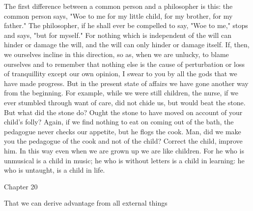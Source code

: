 \documentclass[a4paper]{article}
\begin{document}
    The first difference between a common person and a philosopher is this: the
common person says, "Woe to me for my little child, for my brother, for my
father." The philosopher, if he shall ever be compelled to say, "Woe to me,"
stops and says, "but for myself." For nothing which is independent of the will
can hinder or damage the will, and the will can only hinder or damage itself.
If, then, we ourselves incline in this direction, so as, when we are unlucky,
to blame ourselves and to remember that nothing else is the cause of
perturbation or loss of tranquillity except our own opinion, I swear to you by
all the gods that we have made progress. But in the present state of affairs we
have gone another way from the beginning. For example, while we were still
children, the nurse, if we ever stumbled through want of care, did not chide
us, but would beat the stone. But what did the stone do? Ought the stone to
have moved on account of your child's folly? Again, if we find nothing to eat
on coming out of the bath, the pedagogue never checks our appetite, but he
flogs the cook. Man, did we make you the pedagogue of the cook and not of the
child? Correct the child, improve him. In this way even when we are grown up we
are like children. For he who is unmusical is a child in music; he who is
without letters is a child in learning: he who is untaught, is a child in life.

Chapter 20

That we can derive advantage from all external things
\end{document}
